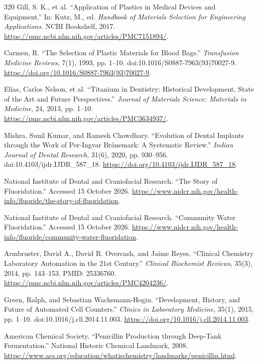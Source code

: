 \documentclass[12pt,oneside]{book}
\begin{document}
\begin{thebibliography}{320}
Gill, S. K., et al. ``Application of Plastics in Medical Devices and Equipment.''
In: Kutz, M., ed. \emph{Handbook of Materials Selection for Engineering
Applications}. NCBI Bookshelf, 2017.
\url{https://pmc.ncbi.nlm.nih.gov/articles/PMC7151894/}.

Carmen, R. ``The Selection of Plastic Materials for Blood Bags.''
\emph{Transfusion Medicine Reviews}, 7(1), 1993, pp. 1--10.
doi:10.1016/S0887-7963(93)70027-9.
\url{https://doi.org/10.1016/S0887-7963(93)70027-9}.

Elias, Carlos Nelson, et al. ``Titanium in Dentistry: Historical Development,
State of the Art and Future Perspectives.'' \emph{Journal of Materials
Science: Materials in Medicine}, 24, 2013, pp. 1--10.
\url{https://pmc.ncbi.nlm.nih.gov/articles/PMC3634937/}.

Mishra, Sunil Kumar, and Ramesh Chowdhary. ``Evolution of Dental Implants
through the Work of Per-Ingvar Br\aa nemark: A Systematic Review.''
\emph{Indian Journal of Dental Research}, 31(6), 2020, pp. 930--956.
doi:10.4103/ijdr.IJDR\_587\_18.
\url{https://doi.org/10.4103/ijdr.IJDR_587_18}.

National Institute of Dental and Craniofacial Research. ``The Story of
Fluoridation.'' Accessed 15 October 2026.
\url{https://www.nidcr.nih.gov/health-info/fluoride/the-story-of-fluoridation}.

National Institute of Dental and Craniofacial Research. ``Community Water
Fluoridation.'' Accessed 15 October 2026.
\url{https://www.nidcr.nih.gov/health-info/fluoride/community-water-fluoridation}.

Armbruster, David A., David R. Overcash, and Jaime Reyes. ``Clinical Chemistry
Laboratory Automation in the 21st Century.'' \emph{Clinical Biochemist Reviews},
35(3), 2014, pp. 143--153. PMID: 25336760.
\url{https://pmc.ncbi.nlm.nih.gov/articles/PMC4204236/}.

Green, Ralph, and Sebastian Wachsmann-Hogiu. ``Development, History, and Future
of Automated Cell Counters.'' \emph{Clinics in Laboratory Medicine}, 35(1),
2015, pp. 1--10. doi:10.1016/j.cll.2014.11.003.
\url{https://doi.org/10.1016/j.cll.2014.11.003}.

American Chemical Society. ``Penicillin Production through Deep-Tank
Fermentation.'' National Historic Chemical Landmark, 2008.
\url{https://www.acs.org/education/whatischemistry/landmarks/penicillin.html}.


\end{thebibliography}
\end{document}
